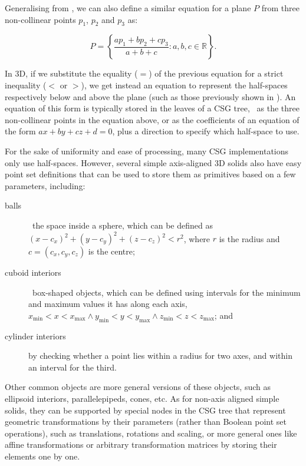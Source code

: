 Generalising from , we can also define a similar equation for a plane \(P\) from three non-collinear points \(p_1\), \(p_2\) and \(p_3\) as:

\begin{equation}
P = \left\{ \frac{a p_1 + b p_2 + c p_3}{a+b+c} : a,b,c \in \mathbb{R} \right\}.
\end{equation}

In 3D, if we substitute the equality (\(=\)) of the previous equation for a strict inequality (\(<\) or \(>\)), we get instead an equation to represent the half-spaces respectively below and above the plane (such as those previously shown in ).
An equation of this form is typically stored in the leaves of a CSG tree, \eg\ as the three non-collinear points in the equation above, or as the coefficients of an equation of the form \(ax + by + cz + d = 0 \), plus a direction to specify which half-space to use.

For the sake of uniformity and ease of processing, many CSG implementations only use half-spaces.
However, several simple axis-aligned 3D solids also have easy point set definitions that can be used to store them as primitives based on a few parameters, including:

\begin{description}
\item[balls] \ie\ the space inside a sphere, which can be defined as \( (x-c_x)^2 + (y-c_y)^2 + (z-c_z)^2 < r^2\), where \(r\) is the radius and \(c = (c_x, c_y, c_z)\) is the centre;
\item[cuboid interiors] \ie\ box-shaped objects, which can be defined using intervals for the minimum and maximum values it has along each axis, \ie\ \( x_\mathrm{min} < x < x_\mathrm{max} \wedge y_\mathrm{min} < y < y_\mathrm{max} \wedge z_\mathrm{min} < z < z_\mathrm{max} \); and
\item[cylinder interiors] by checking whether a point lies within a radius for two axes, and within an interval for the third.
\end{description}

Other common objects are more general versions of these objects, such as ellipsoid interiors, parallelepipeds, cones, etc.
As for non-axis aligned simple solids, they can be supported by special nodes in the CSG tree that represent geometric transformations by their parameters (rather than Boolean point set operations), such as translations, rotations and scaling, or more general ones like affine transformations or arbitrary transformation matrices by storing their elements one by one.


